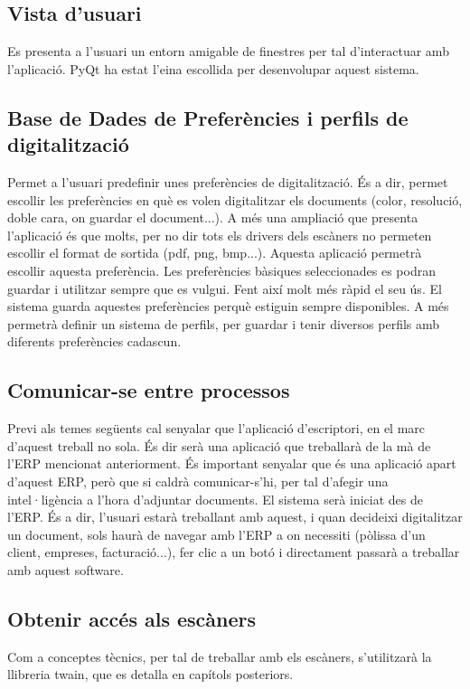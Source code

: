 \documentclass[letterpaper,11pt,catalan]{sphinxmanual}
\begin{document}
\subsection{Vista d'usuari}
\label{\detokenize{index:vista-d-usuari}}
Es presenta a l'usuari un entorn amigable de finestres per tal d'interactuar amb l'aplicació. PyQt ha
estat l'eina escollida per desenvolupar aquest sistema.


\subsection{Base de Dades de Preferències i perfils de digitalització}
\label{\detokenize{index:base-de-dades-de-preferencies-i-perfils-de-digitalitzacio}}
Permet a l'usuari predefinir unes preferències de digitalització. És a dir, permet escollir
les preferències en què es volen digitalitzar els documents (color, resolució, doble cara, on guardar el document...).
A més una ampliació que presenta l'aplicació és que molts, per no dir tots els drivers
dels escàners no permeten escollir el format de sortida (pdf, png, bmp...).
Aquesta aplicació permetrà escollir aquesta preferència. Les preferències bàsiques seleccionades es podran guardar
i utilitzar sempre que es vulgui. Fent així molt més ràpid el seu ús.
El sistema guarda aquestes preferències perquè estiguin sempre disponibles.
A més permetrà definir un sistema de perfils, per guardar i tenir diversos perfils amb diferents preferències cadascun.


\subsection{Comunicar-se entre processos}
\label{\detokenize{index:comunicar-se-entre-processos}}
Previ als temes següents cal senyalar que l'aplicació d'escriptori, en el marc d'aquest treball
no  sola. És dir serà una aplicació que treballarà de la mà de l'ERP mencionat anteriorment.
És important senyalar que és una aplicació apart d'aquest ERP, però que si caldrà comunicar-s'hi, per
tal d'afegir una intel·ligència a l'hora d'adjuntar documents. El sistema serà iniciat des de l'ERP.
És a dir, l'usuari estarà treballant amb aquest, i quan decideixi digitalitzar un document, sols haurà de navegar amb l'ERP a on necessiti (pòlissa d'un client,
empreses, facturació...), fer clic a un botó i directament passarà a treballar amb aquest software.


\subsection{Obtenir accés als escàners}
\label{\detokenize{index:obtenir-acces-als-escaners}}
Com a conceptes tècnics, per tal de treballar amb els escàners, s'utilitzarà la llibreria
twain, que es detalla en capítols posteriors.
\end{document}
